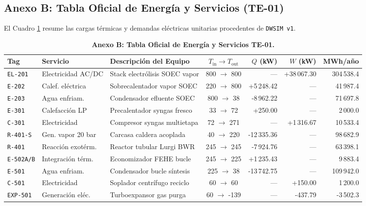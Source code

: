 \documentclass[10pt,letterpaper]{article}
\begin{document}
\newpage
\subsection{Anexo B: Tabla Oficial de Energía y Servicios (TE-01)}
El Cuadro \ref{tab:te01_anexo} resume las cargas térmicas y demandas eléctricas unitarias procedentes de \texttt{DWSIM v1}.

\begin{table}[H]
\centering\small
\setlength{\tabcolsep}{4pt}
\renewcommand{\arraystretch}{1.15}
\caption{\textbf{Anexo B: Tabla Oficial de Energía y Servicios TE-01.}} \label{tab:te01_anexo}
\begin{tabularx}{\textwidth}{l p{2.8cm} p{4.0cm} c r r r}
\toprule
\rowcolor{tableheader}
\color{white}\textbf{Tag} & \color{white}\textbf{Servicio} & \color{white}\textbf{Descripción del Equipo} & \color{white}\textbf{$T_{\text{in}} \to T_{\text{out}}$} & \color{white}\textbf{$Q$ (kW)} & \color{white}\textbf{$W$ (kW)} & \color{white}\textbf{MWh/año} \\
\midrule
\texttt{EL-201} & Electricidad AC/DC & Stack electrólisis SOEC vapor & 800 $\to$ 800 & --- & +38\,067.30 & 304\,538.4 \\
\texttt{E-202} & Calef. eléctrica & Sobrecalentador vapor SOEC & 220 $\to$ 800 & +5\,248.42 & --- & 41\,987.4 \\
\texttt{E-203} & Agua enfriam. & Condensador efluente SOEC & 800 $\to$ 38 & -8\,962.22 & --- & 71\,697.8 \\
\texttt{E-301} & Calefacción LP & Precalentador syngas fresco & 33 $\to$ 72 & +250.00 & --- & 2\,000.0 \\
\texttt{C-301} & Electricidad & Compresor syngas multietapa & 72 $\to$ 271 & --- & +1\,316.67 & 10\,533.4 \\
\texttt{R-401-S} & Gen. vapor 20 bar & Carcasa caldera acoplada & 40 $\to$ 220 & -12\,335.36 & --- & 98\,682.9 \\
\texttt{R-401} & Reacción exotérm. & Reactor tubular Lurgi BWR & 245 $\to$ 245 & -7\,924.76 & --- & 63\,398.1 \\
\texttt{E-502A/B} & Integración térm. & Economizador FEHE bucle & 245 $\to$ 225 & +1\,235.43 & --- & 9\,883.4 \\
\texttt{E-501} & Agua enfriam. & Condensador bucle síntesis & 225 $\to$ 38 & -13\,742.75 & --- & 109\,942.0 \\
\texttt{C-501} & Electricidad & Soplador centrífugo reciclo & 60 $\to$ 60 & --- & +150.00 & 1\,200.0 \\
\texttt{EXP-501} & Generación eléc. & Turboexpansor gas purga & 60 $\to$ -139 & --- & -437.79 & -3\,502.3 \\

\end{tabularx}
\end{table}
\end{document}

